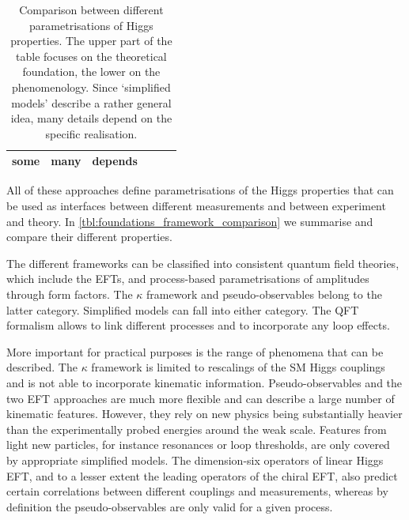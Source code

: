 \begin{table}
\begin{tabularx}{\textwidth}{LLLLLL}
    some & 
    many &
    depends \\
    \bottomrule
  \end{tabularx}
  \caption[Comparison between different parametrisations of Higgs properties]{Comparison
    between different parametrisations of Higgs properties. The upper part of the table
    focuses on the theoretical foundation, the lower on the phenomenology.
    Since `simplified models' describe a rather general idea, many
    details depend on the specific realisation.}
  \label{tbl:foundations_framework_comparison}
\end{table}

All of these approaches define parametrisations of the Higgs properties
that can be used as interfaces between different measurements and
between experiment and theory. In
\autoref{tbl:foundations_framework_comparison} we summarise and
compare their different properties.

The different frameworks can be classified into consistent quantum
field theories, which include the EFTs, and process-based
parametrisations of amplitudes through form factors. The $\kappa$
framework and pseudo-observables belong to the latter
category. Simplified models can fall into either category. The QFT
formalism allows to link different processes and to incorporate any
loop effects.

More important for practical purposes is the range of phenomena that
can be described. The $\kappa$ framework is limited to rescalings of
the SM Higgs couplings and is not able to incorporate kinematic
information. Pseudo-observables and the two EFT approaches are much
more flexible and can describe a large number of kinematic
features. However, they rely on new physics being substantially
heavier than the experimentally probed energies around the weak
scale. Features from light new particles, for instance resonances or
loop thresholds, are only covered by appropriate simplified
models. The dimension-six operators of linear Higgs EFT, and to a
lesser extent the leading operators of the chiral EFT, also predict
certain correlations between different couplings and measurements,
whereas by definition the pseudo-observables are only valid for a given
process.

